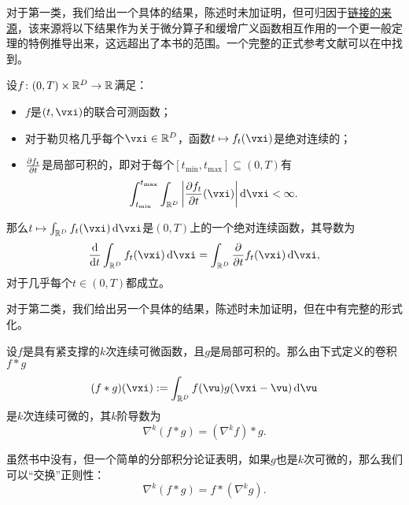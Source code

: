 \documentclass[../../book-main.tex]{subfiles}
\begin{document}
对于第一类，我们给出一个具体的结果，陈述时未加证明，但可归因于\href{https://planetmath.org/differentiationundertheintegralsign}{链接的来源}，该来源将以下结果作为关于微分算子和缓增广义函数相互作用的一个更一般定理的特例推导出来，这远超出了本书的范围。一个完整的正式参考文献可以在\cite{jones1982theory}中找到。
\begin{proposition}\label{prop:dutis}
    设\(f \colon (0, T) \times \mathbb{R}^{D} \to \mathbb{R}\)满足：
    \begin{itemize}
        \item \(f\)是\((t, \vxi)\)的联合可测函数；
        \item 对于勒贝格几乎每个\(\vxi \in \R^{D}\)，函数\(t \mapsto f_{t}(\vxi)\)是绝对连续的；
        \item \(\pdv{f_{t}}{t}\)是局部可积的，即对于每个\([t_{\min}, t_{\max}] \subseteq (0, T)\)有
        \begin{equation}
            \int_{t_{\min}}^{t_{\max}}\int_{\R^{D}}\abs*{\pdv{f_{t}}{t}(\vxi)}\odif{\vxi} < \infty.
        \end{equation}
    \end{itemize}
    那么\(t \mapsto \int_{\R^{D}}f_{t}(\vxi)\odif{\vxi}\)是\((0, T)\)上的一个绝对连续函数，其导数为
    \begin{equation}
        \odv*{\int_{\R^{D}}f_{t}(\vxi)\odif{\vxi}}{t} = \int_{\R^{D}}\pdv*{f_{t}}{t}(\vxi)\odif{\vxi},
    \end{equation}
    对于几乎每个\(t \in (0, T)\)都成立。
\end{proposition}

对于第二类，我们给出另一个具体的结果，陈述时未加证明，但在\cite{brezis2011functional}中有完整的形式化。
\begin{proposition}\label{prop:diff_convolution}
    设\(f\)是具有紧支撑的\(k\)次连续可微函数，且\(g\)是局部可积的。那么由下式定义的卷积\(f * g\)
    \begin{equation}
        (f * g)(\vxi) := \int_{\R^{D}}f(\vu)g(\vxi - \vu)\odif{\vu}
    \end{equation}
    是\(k\)次连续可微的，其\(k\)阶导数为
    \begin{equation}
        \nabla^{k}(f * g) =(\nabla^{k}f) * g. 
    \end{equation}
\end{proposition}
虽然书中没有，但一个简单的分部积分论证表明，如果\(g\)也是\(k\)次可微的，那么我们可以“交换”正则性：
\begin{equation}
    \nabla^{k}(f * g) = f * (\nabla^{k} g).
\end{equation}
\end{document}
